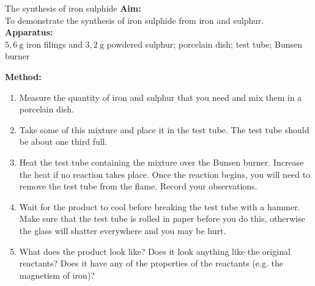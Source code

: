             \begin{g_experiment}{The synthesis of iron sulphide }
            \nopagebreak
            \label{m38709*id63437}\noindent{}\textbf{Aim:} \\
     To demonstrate the synthesis of iron sulphide from iron and sulphur. \\
        \label{m38709*id63447}\noindent{}\textbf{Apparatus:} \\
$5,6~\text{g}$ iron filings and $3,2~\text{g}$ powdered sulphur; porcelain dish; test tube; Bunsen burner \\
        \label{m38709*id63457}
    \setcounter{subfigure}{0}
    \begin{center}
    \end{center}
        \label{m38709*id63467}\noindent{}\textbf{Method:} 
\begin{enumerate}[noitemsep, label=\textbf{\arabic*}. ] 
\item 
Measure the quantity of iron and sulphur that you need and mix them in a porcelain dish.
\item 
Take some of this mixture and place it in the test tube. The test tube should be about one third full.
\item 
Heat the test tube containing the mixture over the Bunsen burner. Increase the heat if no reaction takes place. Once the reaction begins, you will need to remove the test tube from the flame. Record your observations.
\item
 Wait for the product to cool before breaking the test tube with a hammer. Make sure that the test tube is rolled in paper before you do this, otherwise the glass will shatter everywhere and you may be hurt.
\item 
What does the product look like? Does it look anything like the original reactants? Does it have any of the properties of the reactants (e.g. the magnetism of iron)?
\end{enumerate}


\end{g_experiment}
